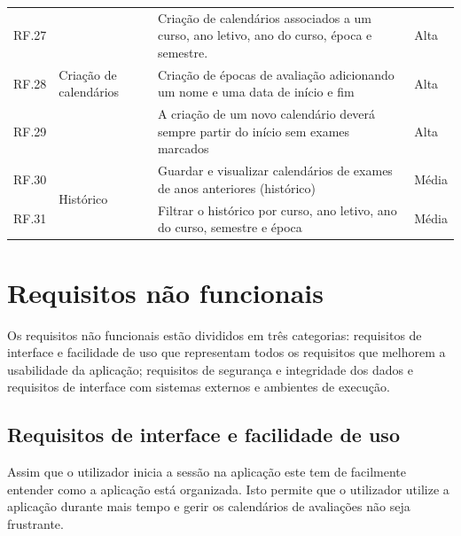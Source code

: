 \documentclass[11pt, twoside]{report}
\begin{document}
\begin{center}
\begin{longtable}{|m{1cm}|m{2.2cm}|m{10cm}|m{2cm}|}
			RF.27 &\multirow{3}{2cm}{Criação de calendários}&Criação de calendários associados a um curso, ano letivo, ano do curso, época e semestre.& Alta \\
			
			RF.28 && Criação de épocas de avaliação adicionando um nome e uma data de início e fim & Alta \\
			
			RF.29 && A criação de um novo calendário deverá sempre partir do início sem exames marcados & Alta\\
			\hline
			RF.30 &\multirow{2}{*}{Histórico}& Guardar e visualizar calendários de exames de anos anteriores (histórico)& Média \\
			
			RF.31 && Filtrar o histórico por curso, ano letivo, ano do curso, semestre e época& Média \\
			\hline
		\end{longtable}
	\end{center}



	
	\section{Requisitos não funcionais}
	
	Os requisitos não funcionais estão divididos em três categorias: requisitos de interface e facilidade de uso que representam todos os requisitos que melhorem a usabilidade da aplicação; requisitos de segurança e integridade dos dados e requisitos de interface com sistemas externos e ambientes de execução.
	
	\subsection{Requisitos de interface e facilidade de uso}

Assim que o utilizador inicia a sessão na aplicação este tem de facilmente entender como a aplicação está organizada.
Isto permite que o utilizador utilize a aplicação durante mais tempo e gerir os calendários de avaliações não seja frustrante.
	
\end{document}
